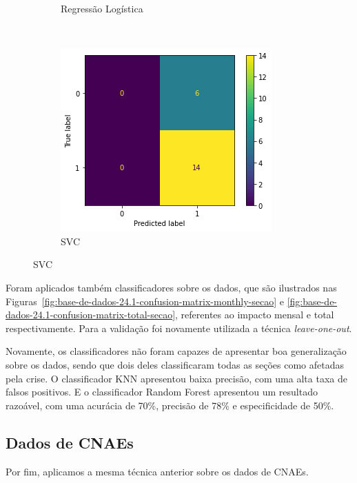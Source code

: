 \begin{figure}[htb]
\begin{subfigure}[b]{0.45\textwidth}
        \caption{Regressão Logística}
        \label{fig:resultados:base-de-dados-24.3-confusion-matrix-logisticregression-total-secao}
    \end{subfigure} ~ \quad
    \begin{subfigure}[b]{0.45\textwidth}
        \includegraphics[scale=0.75]{images/base-de-dados-24.2-confusion-matrix-svc-total-secao.png}
        \caption{SVC}
        \label{fig:resultados:base-de-dados-24.1-confusion-matrix-svc-total-secao}
    \end{subfigure}
    \fdadospesquisa
\end{figure}

Foram aplicados também classificadores sobre os dados, que são ilustrados nas Figuras~\ref{fig:base-de-dados-24.1-confusion-matrix-monthly-secao} e \ref{fig:base-de-dados-24.1-confusion-matrix-total-secao}, referentes ao impacto mensal e total respectivamente. Para a validação foi novamente utilizada a técnica \textit{leave-one-out}.

Novamente, os classificadores não foram capazes de apresentar boa generalização sobre os dados, sendo que dois deles classificaram todas as seções como afetadas pela crise. O classificador KNN apresentou baixa precisão, com uma alta taxa de falsos positivos. E o classificador Random Forest apresentou um resultado razoável, com uma acurácia de 70\%, precisão de 78\% e especificidade de 50\%.

\subsection{Dados de CNAEs}
\label{section:deteccao-impacto:cnae}

Por fim, aplicamos a mesma técnica anterior sobre os dados de CNAEs.

